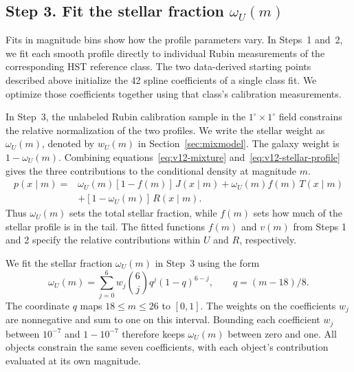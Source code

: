 \subsection{Step 3. Fit the stellar fraction \texorpdfstring{\(\omega_U(m)\)}{omega U}}

Fits in magnitude bins show how the profile parameters vary. In
Steps~1 and~2, we fit each smooth profile directly to individual
Rubin measurements of the corresponding HST reference class. The
two data-derived starting points described above initialize the
42 spline coefficients of a single class fit. We optimize those
coefficients together using that class's calibration measurements.

In Step~3, the unlabeled Rubin calibration sample in the
\(1^\circ\times1^\circ\) field constrains the relative normalization
of the two profiles. We write the stellar weight as \(\omega_U(m)\),
denoted by \(w_U(m)\) in Section~\ref{sec:mixmodel}. The galaxy weight
is \(1-\omega_U(m)\). Combining equations~\eqref{eq:v12-mixture}
and~\eqref{eq:v12-stellar-profile} gives the three contributions to
the conditional density at magnitude \(m\).
\[
\begin{aligned}
 p(x\mid m)={}&\omega_U(m)[1-f(m)]\,J(x\mid m)
              +\omega_U(m)f(m)\,T(x\mid m)\\
             &+[1-\omega_U(m)]\,R(x\mid m).
\end{aligned}
\]
Thus \(\omega_U(m)\) sets the total stellar fraction, while \(f(m)\)
sets how much of the stellar profile is in the tail. The fitted
functions \(f(m)\) and \(v(m)\) from Steps 1 and 2 specify the
relative contributions within \(U\) and \(R\), respectively.

We fit the stellar fraction \(\omega_U(m)\) in Step~3 using the form
\begin{equation}
 \omega_U(m)=\sum_{j=0}^6 w_j\binom{6}{j}q^j(1-q)^{6-j},\qquad
 q=(m-18)/8 .
 \label{eq:v12-weight}
\end{equation}
The coordinate \(q\) maps \(18\leq m\leq26\) to \([0,1]\). The
weights on the coefficients \(w_j\) are nonnegative and sum to one on this interval.
Bounding each coefficient \(w_j\) between \(10^{-7}\) and
\(1-10^{-7}\) therefore keeps \(\omega_U(m)\) between zero and one.
All objects constrain the same seven coefficients, with each object's
contribution evaluated at its own magnitude.

